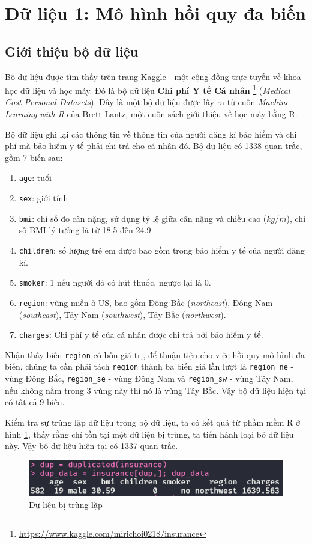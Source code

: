 \section{Dữ liệu 1: Mô hình hồi quy đa biến}

\subsection*{Giới thiệu bộ dữ liệu}
Bộ dữ liệu được tìm thấy trên trang Kaggle - một cộng đồng trực tuyến về khoa học dữ liệu và học máy. Đó là bộ dữ liệu \textbf{Chi phí Y tế Cá nhân} \footnote{\url{https://www.kaggle.com/mirichoi0218/insurance}} (\textit{Medical Cost Personal Datasets}). Đây là một bộ dữ liệu được lấy ra từ cuốn \textit{Machine Learning with R} của Brett Lantz, một cuốn sách giới thiệu về học máy bằng R.

Bộ dữ liệu ghi lại các thông tin về thông tin của người đăng kí bảo hiểm và chi phí mà bảo hiểm y tế phải chi trả cho cá nhân đó. Bộ dữ liệu có 1338 quan trắc, gồm 7 biến sau:
\begin{enumerate}
	\item \texttt{age}: tuổi
	\item \texttt{sex}: giới tính
	\item \texttt{bmi}: chỉ số đo cân nặng, sử dụng tỷ lệ giữa cân nặng và chiều cao ($kg / m$), chỉ số BMI lý tưởng là từ 18.5 đến 24.9.
	\item \texttt{children}: số lượng trẻ em được bao gồm trong bảo hiểm y tế của người đăng kí.	
	\item \texttt{smoker}: 1 nếu người đó có hút thuốc, ngược lại là 0.
	\item \texttt{region}: vùng miền ở US, bao gồm Đông Bắc (\textit{northeast}), Đông Nam (\textit{southeast}), Tây Nam (\textit{southwest}), Tây Bắc (\textit{northwest}).
	\item \texttt{charges}: Chi phí y tế của cá nhân được chi trả bởi bảo hiểm y tế.
\end{enumerate}

Nhận thấy biến \texttt{region} có bốn giá trị, để thuận tiện cho việc hồi quy mô hình đa biến, chúng ta cần phải tách \texttt{region} thành ba biến giả lần lượt là \texttt{region\_ne} - vùng Đông Bắc, \texttt{region\_se} - vùng Đông Nam và \texttt{region\_sw} - vùng Tây Nam, nếu không nằm trong 3 vùng này thì nó là vùng Tây Bắc. Vậy bộ dữ liệu hiện tại có tất cả 9 biến.

Kiểm tra sự trùng lặp dữ liệu trong bộ dữ liệu, ta có kết quả từ phầm mềm R ở hình \ref{fig-a1:dataset-duplicated}, thấy rằng chỉ tồn tại một dữ liệu bị trùng, ta tiến hành loại bỏ dữ liệu này. Vậy bộ dữ liệu hiện tại có 1337 quan trắc.
\begin{figure}[H]
	\centering
	\includegraphics[width=0.7\linewidth]{images/A1/dataset-duplicated}
	\caption{Dữ liệu bị trùng lặp}
	\label{fig-a1:dataset-duplicated}
\end{figure}

